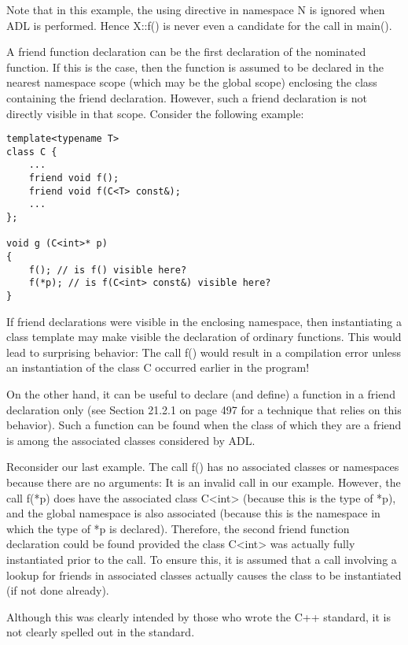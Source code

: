 Note that in this example, the using directive in namespace N is ignored when ADL is performed. Hence X::f() is never even a candidate for the call in main().


A friend function declaration can be the first declaration of the nominated function. If this is the case, then the function is assumed to be declared in the nearest namespace scope (which may be the global scope) enclosing the class containing the friend declaration. However, such a friend declaration is not directly visible in that scope. Consider the following example:

\begin{lstlisting}[style=styleCXX]
template<typename T>
class C {
	...
	friend void f();
	friend void f(C<T> const&);
	...
};

void g (C<int>* p)
{
	f(); // is f() visible here?
	f(*p); // is f(C<int> const&) visible here?
}
\end{lstlisting}

If friend declarations were visible in the enclosing namespace, then instantiating a class template may make visible the declaration of ordinary functions. This would lead to surprising behavior: The call f() would result in a compilation error unless an instantiation of the class C occurred earlier in the program!

On the other hand, it can be useful to declare (and define) a function in a friend declaration only (see Section 21.2.1 on page 497 for a technique that relies on this behavior). Such a function can be found when the class of which they are a friend is among the associated classes considered by ADL.

Reconsider our last example. The call f() has no associated classes or namespaces because there are no arguments: It is an invalid call in our example. However, the call f(*p) does have the associated class C<int> (because this is the type of *p), and the global namespace is also associated (because this is the namespace in which the type of *p is declared). Therefore, the second friend function declaration could be found provided the class C<int> was actually fully instantiated prior to the call. To ensure this, it is assumed that a call involving a lookup for friends in associated classes actually causes the class to be instantiated (if not done already).

\begin{tcolorbox}[colback=webgreen!5!white,colframe=webgreen!75!black]
\hspace*{0.75cm}Although this was clearly intended by those who wrote the C++ standard, it is not clearly spelled out in the standard.
\end{tcolorbox}

